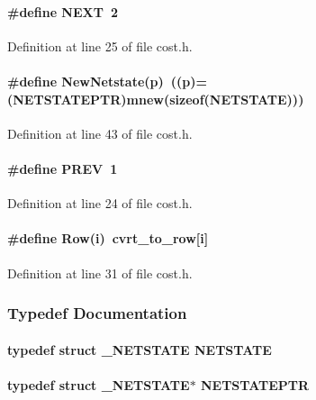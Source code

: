 \paragraph{\setlength{\rightskip}{0pt plus 5cm}\#define NEXT\ 2}\hfill



Definition at line 25 of file cost.h.\label{cost.h_a7}
\paragraph{\setlength{\rightskip}{0pt plus 5cm}\#define New\-Netstate(p)\ ((p)=({\bf NETSTATEPTR})mnew(sizeof({\bf NETSTATE})))}\hfill



Definition at line 43 of file cost.h.\label{cost.h_a1}
\paragraph{\setlength{\rightskip}{0pt plus 5cm}\#define PREV\ 1}\hfill



Definition at line 24 of file cost.h.\label{cost.h_a3}
\paragraph{\setlength{\rightskip}{0pt plus 5cm}\#define Row(i)\ {\bf cvrt\_\-to\_\-row}[i]}\hfill



Definition at line 31 of file cost.h.

\subsubsection{Typedef Documentation}
\label{cost.h_a9}
\paragraph{\setlength{\rightskip}{0pt plus 5cm}typedef struct {\bf \_\-NETSTATE}
 NETSTATE}\hfill

\label{cost.h_a10}
\paragraph{\setlength{\rightskip}{0pt plus 5cm}typedef struct {\bf \_\-NETSTATE}$\ast$ NETSTATEPTR}\hfill



